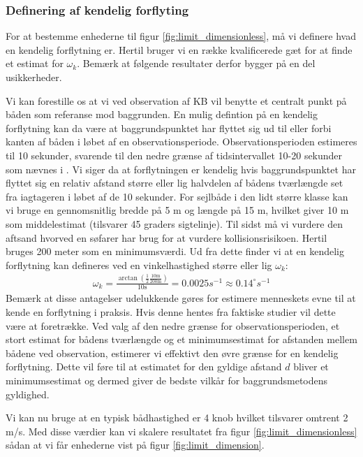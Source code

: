 \documentclass[%
 reprint,
nofootinbib,
aps,
]{revtex4-1}
\begin{document}
\subsubsection{Definering af kendelig forflyting}
For at bestemme enhederne til figur \ref{fig:limit_dimensionless}, må vi definere hvad en kendelig forflytning er. Hertil bruger vi en række kvalificerede gæt for at finde et estimat for $\omega_k$. Bemærk at følgende resultater derfor bygger på en del usikkerheder. \par
Vi kan forestille os at vi ved observation af KB vil benytte et centralt punkt på båden som referanse mod baggrunden. En mulig defintion på en kendelig forflytning kan da være at baggrundspunktet har flyttet sig ud til eller forbi kanten af båden i løbet af en observationsperiode. Observationsperioden estimeres til 10 sekunder, svarende til den nedre grænse af tidsintervallet 10-20 sekunder som nævnes i \cite{duelighed}. Vi siger da at forflytningen er kendelig hvis baggrundspunktet har flyttet sig en relativ afstand større eller lig halvdelen af bådens tværlængde set fra iagtageren i løbet af de 10 sekunder. For sejlbåde i den lidt større klasse kan vi bruge en gennomsnitlig bredde på 5 m og længde på 15 m, hvilket giver 10 m som middelestimat (tilsvarer 45 graders sigtelinje). Til sidst må vi vurdere den aftsand hvorved en søfarer har brug for at vurdere kollisionsrisikoen. Hertil bruges 200 meter som en minimumsværdi. Ud fra dette finder vi at en kendelig forflytning kan defineres ved en vinkelhastighed større eller lig $\omega_k$:
\begin{align}
  \omega_k = \frac{\arctan{(\frac{1}{2}\frac{10 \text{m}}{200 \text{m}})}}{10 \text{s}} = 0.0025 s^{-1} \approx  0.14^{\circ}s^{-1}
  \label{eq:omega_k}
\end{align}
Bemærk at disse antagelser udelukkende gøres for estimere menneskets evne til at kende en forflytning i praksis. Hvis denne hentes fra faktiske studier vil dette være at foretrække. Ved valg af den nedre grænse for observationsperioden, et stort estimat for bådens tværlængde og et minimumsestimat for afstanden mellem bådene ved observation, estimerer vi effektivt den øvre grænse for en kendelig forflytning. Dette vil føre til at estimatet for den gyldige afstand $d$ bliver et minimumsestimat og dermed giver de bedste vilkår for baggrundsmetodens gyldighed. \par
Vi kan nu bruge at en typisk bådhastighed er 4 knob hvilket tilsvarer omtrent 2 m/s. Med disse værdier kan vi skalere resultatet fra figur \ref{fig:limit_dimensionless} sådan at vi får enhederne vist på figur \ref{fig:limit_dimension}.
\end{document}
